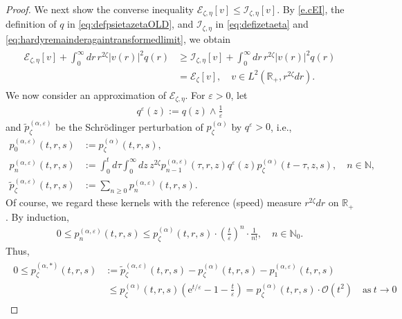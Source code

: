 \documentclass[12pt,reqno]{amsart}
\theoremstyle{definition}
\theoremstyle{remark}
\numberwithin{equation}{section}
\newcommand{\1}{\mathbbm{1}}
\renewcommand{\epsilon}{\varepsilon}
\newcommand{\N}{\mathbb{N}}
\newcommand{\R}{\mathbb{R}}
\def\ce{\mathcal{E}}
\def\ci{\mathcal{I}}
\newcommand{\me}[1]{\mathrm{e}^{#1}}
\begin{document}
\begin{proof}
  We next show the converse inequality $\ce_{\zeta,\eta}[v] \leq \ci_{\zeta,\eta}[v]$. By \eqref{e.cEI}, the definition of $q$ in \eqref{eq:defpsietazetaOLD}, and $\ci_{\zeta,\eta}$ in \eqref{eq:defizetaeta} and \eqref{eq:hardyremainderagaintransformedlimit}, we obtain
  \begin{align}
    \label{eq:boglem51aux1}
    \begin{split}
      \ce_{\zeta,\eta}[v] + \int_0^\infty dr\, r^{2\zeta} |v(r)|^2q(r)
      & \geq \ci_{\zeta,\eta}[v] + \int_0^\infty dr\, r^{2\zeta} |v(r)|^2q(r) \\
      & = \ce_\zeta[v], \quad v\in L^2(\R_+,r^{2\zeta}dr).
    \end{split}
  \end{align}
  We now consider an approximation of $\ce_{\zeta,\eta}$. For $\epsilon>0$, let
  \begin{align}
    q^\epsilon(z) := q(z)\wedge \frac1\epsilon
  \end{align}
  and $\tilde p_\zeta^{(\alpha,\epsilon)}$ be the Schr\"odinger perturbation of $p_\zeta^{(\alpha)}$ by $q^\epsilon>0$, i.e.,
  \begin{align}
    p_0^{(\alpha,\epsilon)}(t,r,s) & := p_\zeta^{(\alpha)}(t,r,s), \\
    p_n^{(\alpha,\epsilon)}(t,r,s) & := \int_0^t d\tau \int_0^\infty dz\, z^{2\zeta} p_{n-1}^{(\alpha,\epsilon)}(\tau,r,z)q^\epsilon(z)p_\zeta^{(\alpha)}(t-\tau,z,s), \quad n\in\N, \\
    \tilde p_\zeta^{(\alpha,\epsilon)}(t,r,s) & := \sum_{n\geq0} p_n^{(\alpha,\epsilon)}(t,r,s).
  \end{align}
  Of course, we regard these kernels with the reference (speed) measure $r^{2\zeta}dr$ on $\R_+$.
  By induction,
  \begin{align}
    0 \leq p_n^{(\alpha,\epsilon)}(t,r,s) \leq p_\zeta^{(\alpha)}(t,r,s) \cdot \left(\frac{t}{\epsilon}\right)^n \cdot \frac{1}{n!}, \quad n\in\N_0.
  \end{align}
  Thus,
  \begin{align}
    \begin{split}
      0 \leq p_\zeta^{(\alpha,*)}(t,r,s) & := \tilde p_\zeta^{(\alpha,\epsilon)}(t,r,s) - p_\zeta^{(\alpha)}(t,r,s) - p_1^{(\alpha,\epsilon)}(t,r,s) \\
      & \ \leq p_\zeta^{(\alpha)}(t,r,s) \left(\me{t/\epsilon}-1-\frac{t}{\epsilon}\right)
        = p_\zeta^{(\alpha)}(t,r,s) \cdot \mathcal{O}(t^2) \quad \text{as}\ t\to0
    \end{split}
  \end{align}

\end{proof}
\end{document}
